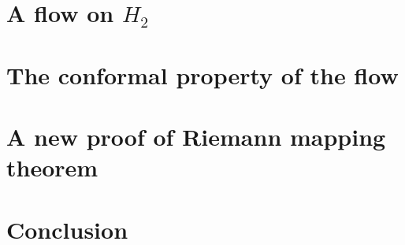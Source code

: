 \documentclass{article}
\begin{document}
\section{A flow on $H_2$}\label{sec:flow}

\section{The conformal property of the flow}\label{sec:conformal}

\section{A new proof of Riemann mapping theorem}\label{sec:riemann-mapping}

\section{Conclusion}\label{sec:conclusion}
\end{document}
